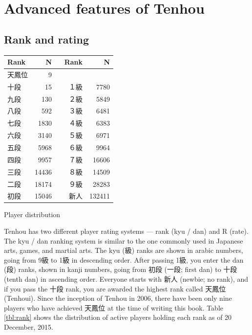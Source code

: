 \chapter{Advanced features of {\jap Tenhou}} \label{ch:Tenhou2}
\thispagestyle{empty}

\section{Rank and rating}

\begin{floatingtable}[r]{
\footnotesize \captionsetup{font=footnotesize}
\centering 
\begin{tabular}{l r r r}
\toprule
Rank & N & Rank & N\\
\midrule
天鳳位	&9\\
十段	&15&	１級	&7780\\
九段	&130&	２級	&5849\\
八段	&592&	３級	&6481\\
七段	&1830&	４級	&6383\\
六段	&3140&	５級	&6971\\
五段	&5968&	６級	&9964\\
四段	&9957&	７級	&16606\\
三段	&14436&	８級	&14509\\
二段	&18174&	９級	&28283\\
初段	&15046&	~~~新人&132411\\
\bottomrule
\end{tabular}}
\caption{Player distribution} \label{tbl:rank}
\end{floatingtable}

{\jap Tenhou} has two different player rating systems --- rank ({\jap kyu / dan}) and R (rate). 
The {\jap kyu / dan} ranking system is similar to the one commonly used in Japanese arts, games, and martial arts. 
The {\jap kyu} (級) ranks are shown in arabic numbers, going from 9級 to 1級 in descending order. After passing 1級, you enter the {\jap dan} (段) ranks, shown in {\jap kanji} numbers, going from 初段 (一段; first {\jap dan}) to 十段 (tenth {\jap dan}) in ascending order. Everyone starts with {\jap 新人} (newbie; no rank), and if you pass the 十段 rank, you are awarded the highest rank called 天鳳位 ({\jap Tenhoui}). Since the inception of {\jap Tenhou} in 2006, there have been only nine players who have achieved 天鳳位 at the time of writing this book. 
Table \ref{tbl:rank} shows the distribution of active players holding each rank as of 20 December, 2015. 


